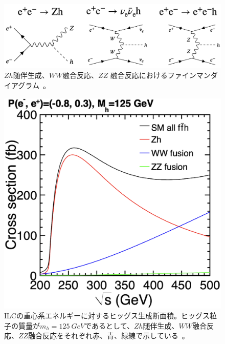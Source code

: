 \begin{figure}[h]
\begin{center}
 \includegraphics[keepaspectratio, scale=0.25]
 	{Figure/Introduction/higgs_cs_feynman.png}
	\caption[ILCにおけるヒッグス生成過程のファインマンダイアグラム]{$Zh$随伴生成、$WW$融合反応、$ZZ$ 融合反応におけるファインマンダイアグラム~\cite{tdr2}。}
	\label{product}
\end{center}
\end{figure}

\begin{figure}[H]
	\begin{center}
 \includegraphics[keepaspectratio, scale=0.3]
 	{Figure/Introduction/hcs.png}
	 	\caption[ILCの重心系エネルギーに対するヒッグス生成断面積]{ILCの重心系エネルギーに対するヒッグス生成断面積。ヒッグス粒子の質量が$m_h=\SI{125}{GeV}$であるとして、$Zh$随伴生成、$WW$融合反応、$ZZ$融合反応をそれぞれ赤、青、緑線で示している~\cite{tdr2}。}
 	\label{hcs}
	\end{center}
 \end{figure}
 
